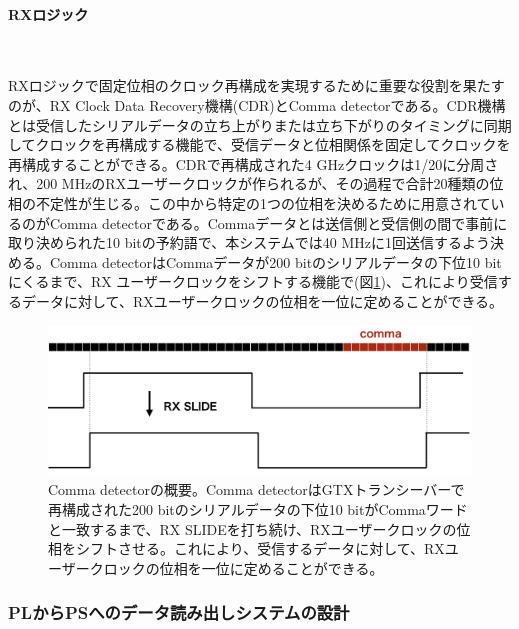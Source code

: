 \paragraph{RXロジック}　\par
RXロジックで固定位相のクロック再構成を実現するために重要な役割を果たすのが、RX Clock Data Recovery機構(CDR)とComma detectorである。CDR機構とは受信したシリアルデータの立ち上がりまたは立ち下がりのタイミングに同期してクロックを再構成する機能で、受信データと位相関係を固定してクロックを再構成することができる。CDRで再構成された4 GHzクロックは1/20に分周され、200 MHzのRXユーザークロックが作られるが、その過程で合計20種類の位相の不定性が生じる。この中から特定の1つの位相を決めるために用意されているのがComma detectorである。Commaデータとは送信側と受信側の間で事前に取り決められた10 bitの予約語で、本システムでは40 MHzに1回送信するよう決める。Comma detectorはCommaデータが200 bitのシリアルデータの下位10 bitにくるまで、RX ユーザークロックをシフトする機能で(図\ref{JATHubcomma})、これにより受信するデータに対して、RXユーザークロックの位相を一位に定めることができる。

\begin{figure} 
\centering
\includegraphics[width=16cm]{fig/QAQC/JATHubcomma.png}
\caption[Comma detectorの概要]{Comma detectorの概要。Comma detectorはGTXトランシーバーで再構成された200 bitのシリアルデータの下位10 bitがCommaワードと一致するまで、RX SLIDEを打ち続け、RXユーザークロックの位相をシフトさせる。これにより、受信するデータに対して、RXユーザークロックの位相を一位に定めることができる。}
\label{JATHubcomma}
\end{figure}


\subsubsection{PLからPSへのデータ読み出しシステムの設計}
\baselineskip
\label{subsubsec_readout}


